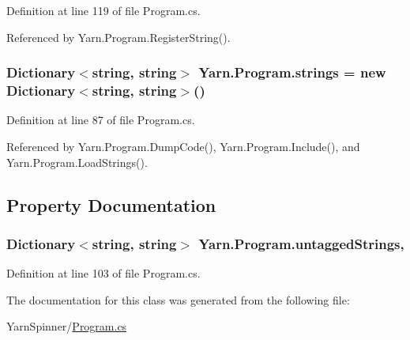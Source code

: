 Definition at line 119 of file Program.\-cs.



Referenced by Yarn.\-Program.\-Register\-String().

\hypertarget{a00152_a59263e00cecfe36d9881b4c30b048f09}{
\subsubsection[{strings}]{\setlength{\rightskip}{0pt plus 5cm}Dictionary$<$string, string$>$ Yarn.\-Program.\-strings = new Dictionary$<$string, string$>$()\hspace{0.3cm}{\ttfamily [package]}}}\label{a00152_a59263e00cecfe36d9881b4c30b048f09}


Definition at line 87 of file Program.\-cs.



Referenced by Yarn.\-Program.\-Dump\-Code(), Yarn.\-Program.\-Include(), and Yarn.\-Program.\-Load\-Strings().



\subsection{Property Documentation}
\hypertarget{a00152_aa8fedbfceaf931d1da3f600eaab6ae87}{
\subsubsection[{untagged\-Strings}]{\setlength{\rightskip}{0pt plus 5cm}Dictionary$<$string, string$>$ Yarn.\-Program.\-untagged\-Strings\hspace{0.3cm}{\ttfamily [get]}, {\ttfamily [package]}}}\label{a00152_aa8fedbfceaf931d1da3f600eaab6ae87}


Definition at line 103 of file Program.\-cs.



The documentation for this class was generated from the following file\-:\begin{DoxyCompactItemize}
\item 
Yarn\-Spinner/\hyperlink{a00314}{Program.\-cs}\end{DoxyCompactItemize}
